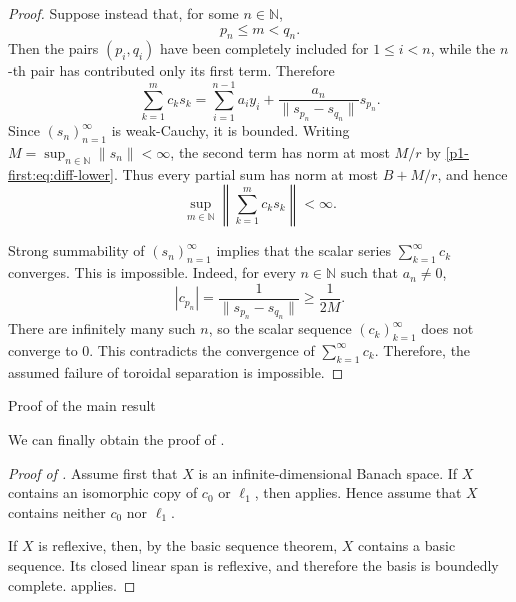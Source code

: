 \documentclass[11pt,reqno]{amsart}
\makeatletter
\theoremstyle{plain}
\theoremstyle{definition}
\newcommand{\N}{\mathbb N}
\newcounter{problempaper}
\newenvironment{problempaperbody}{%
  \setcounter{subsection}{0}%
  \setcounter{subsubsection}{0}%
  \setcounter{paragraph}{0}%
  \renewcommand{\thesubsection}{\arabic{subsection}}%
  \renewcommand{\thesubsubsection}{\thesubsection.\arabic{subsubsection}}%
  \renewcommand{\theparagraph}{\thesubsubsection.\arabic{paragraph}}%
  \let\problem@outersection\section
  \let\problem@outersubsection\subsection
  \let\problem@outersubsubsection\subsubsection
  \let\problem@outerparagraph\paragraph
  \let\section\problem@papersection
  \let\subsection\problem@papersubsection
  \let\subsubsection\problem@papersubsubsection
}{%
  \let\section\problem@outersection
  \let\subsection\problem@outersubsection
  \let\subsubsection\problem@outersubsubsection
  \let\paragraph\problem@outerparagraph
}
\newcommand{\problem@target}[2]{%
  \hypertarget{problem-\theproblempaper-#1-#2}{}%
}
\newcommand{\problem@paperheading}[3]{%
  \par\bigskip
  \problem@target{#1}{#2}%
  \noindent{\large\bfseries #2.\quad #3\par}%
  \nobreak\smallskip
}
\newcommand{\problem@papersubheading}[3]{%
  \par\medskip
  \problem@target{#1}{#2}%
  \noindent{\normalsize\bfseries #2.\quad #3\par}%
  \nobreak\smallskip
}
\newcommand{\problem@papersubsubheading}[3]{%
  \par\smallskip
  \problem@target{#1}{#2}%
  \noindent{\normalsize\itshape #2.\quad #3.\ }%
}
\def\problem@papersection{%
  \@ifstar{\problem@papersectionstar}{\problem@papersectionnostar}%
}
\def\problem@papersectionstar#1{%
  \par\bigskip\noindent{\large\bfseries #1\par}\nobreak\smallskip
}
\def\problem@papersectionnostar#1{%
  \refstepcounter{subsection}%
  \setcounter{subsubsection}{0}%
  \setcounter{paragraph}{0}%
  \problem@paperheading{section}{\thesubsection}{#1}%
  \problem@writecontentsline{section}{\thesubsection}{#1}%
}
\def\problem@papersubsection{%
  \@ifstar{\problem@papersubsectionstar}{\problem@papersubsectionnostar}%
}
\def\problem@papersubsectionstar#1{%
  \par\medskip\noindent{\normalsize\bfseries #1\par}\nobreak\smallskip
}
\def\problem@papersubsectionnostar#1{%
  \refstepcounter{subsubsection}%
  \setcounter{paragraph}{0}%
  \problem@papersubheading{subsection}{\thesubsubsection}{#1}%
  \problem@writecontentsline{subsection}{\thesubsubsection}{#1}%
}
\def\problem@papersubsubsection{%
  \@ifstar{\problem@papersubsubsectionstar}{\problem@papersubsubsectionnostar}%
}
\def\problem@papersubsubsectionstar#1{%
  \par\smallskip\noindent{\normalsize\itshape #1.\ }%
}
\def\problem@papersubsubsectionnostar#1{%
  \refstepcounter{paragraph}%
  \problem@papersubsubheading{subsubsection}{\theparagraph}{#1}%
  \problem@writecontentsline{subsubsection}{\theparagraph}{#1}%
}
\newcommand{\problem@writecontentsline}[3]{%
  \begingroup
  \protected@write\@auxout{}{%
    \string\problemcontentsentry{\theproblempaper}{#1}{#2}{#3}{\thepage}%
  }%
  \endgroup
}
\newcommand{\problemcontentsentry}[5]{%
  \@ifundefined{problemcontents@#1}{%
    \expandafter\gdef\csname problemcontents@#1\endcsname{}%
  }{}%
  \expandafter\g@addto@macro\csname problemcontents@#1\endcsname{%
    \problemcontentsline{#1}{#2}{#3}{#4}{#5}%
  }%
}
\newcommand{\problemcontentslink}[4]{%
  \hyperlink{problem-#1-#2-#3}{#4}%
}
\newcommand{\problemcontentsline}[5]{%
  \ifstrequal{#2}{section}{%
    \par\noindent
    \problemcontentslink{#1}{#2}{#3}{\makebox[2.5em][l]{#3}#4}%
    \nobreak\dotfill
    \problemcontentslink{#1}{#2}{#3}{#5}\par
  }{%
    \ifstrequal{#2}{subsection}{%
      \par\noindent\hspace*{1.5em}%
      \problemcontentslink{#1}{#2}{#3}{\makebox[3.5em][l]{#3}#4}%
      \nobreak\dotfill
      \problemcontentslink{#1}{#2}{#3}{#5}\par
    }{%
      \par\noindent\hspace*{3em}%
      \problemcontentslink{#1}{#2}{#3}{\makebox[4.5em][l]{#3}#4}%
      \nobreak\dotfill
      \problemcontentslink{#1}{#2}{#3}{#5}\par
    }%
  }%
}
\makeatother
\begin{document}
\begin{problempaperbody}
\begin{proof}
Suppose instead that, for some $n\in\N$,
\begin{equation*}
        p_n\leq m<q_n.
\end{equation*}
Then the pairs $(p_i,q_i)$ have been completely included for $1\leq i<n$, while the $n$-th pair has contributed only its first term. Therefore
\begin{equation*}
        \sum_{k=1}^{m}c_ks_k=\sum_{i=1}^{n-1}a_iy_i+\frac{a_n}{\|s_{p_n}-s_{q_n}\|}s_{p_n}.
\end{equation*}
Since $(s_n)_{n=1}^{\infty}$ is weak-Cauchy, it is bounded. Writing $M=\sup_{n\in\N}\|s_n\|<\infty$, the second term has norm at most $M/r$ by \eqref{p1-first:eq:diff-lower}. Thus every partial sum has norm at most $B+M/r$, and hence
\begin{equation}
\label{p1-first:eq:s-partials-bounded}
        \sup_{m\in\N}\left\|\sum_{k=1}^{m}c_ks_k\right\|<\infty.
\end{equation}

Strong summability of $(s_n)_{n=1}^{\infty}$ implies that the scalar series $\sum_{k=1}^{\infty}c_k$ converges. This is impossible. Indeed, for every $n\in\N$ such that $a_n\ne0$,
\begin{equation*}
        |c_{p_n}|=\frac{1}{\|s_{p_n}-s_{q_n}\|}\geq \frac{1}{2M}.
\end{equation*}
There are infinitely many such $n$, so the scalar sequence $(c_k)_{k=1}^{\infty}$ does not converge to $0$. This contradicts the convergence of $\sum_{k=1}^{\infty}c_k$. Therefore, the assumed failure of toroidal separation is impossible.
\end{proof}

\section{Proof of the main result}\label{p1-first:sec:banach-proof}

We can finally obtain the proof of .

\begin{proof}[Proof of ]
Assume first that $X$ is an in\-fi\-nite-di\-men\-sion\-al Banach space. If $X$ contains an isomorphic copy of $c_0$ or $\ell_1$, then  applies. Hence assume that $X$ contains neither $c_0$ nor $\ell_1$.

If $X$ is reflexive, then, by the basic sequence theorem, $X$ contains a basic sequence. Its closed linear span is reflexive, and therefore the basis is boundedly complete.  applies.


\end{proof}
\end{problempaperbody}
\end{document}
